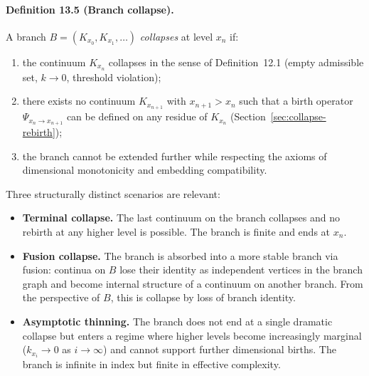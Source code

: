 \paragraph{Definition 13.5 (Branch collapse).}
A branch \(B = (K_{x_0}, K_{x_1}, \dots)\) \emph{collapses} at level
\(x_n\) if:
\begin{enumerate}
  \item the continuum \(K_{x_n}\) collapses in the sense of
        Definition~12.1 (empty admissible set, \(k\to 0\), threshold
        violation);
  \item there exists no continuum \(K_{x_{n+1}}\) with \(x_{n+1}>x_n\)
        such that a birth operator \(\Psi_{x_n\to x_{n+1}}\) can be
        defined on any residue of \(K_{x_n}\) (Section~\ref{sec:collapse-rebirth});
  \item the branch cannot be extended further while respecting the axioms
        of dimensional monotonicity and embedding compatibility.
\end{enumerate}

Three structurally distinct scenarios are relevant:

\begin{itemize}
  \item \textbf{Terminal collapse.}\quad
        The last continuum on the branch collapses and no rebirth at any
        higher level is possible. The branch is finite and ends at \(x_n\).
  \item \textbf{Fusion collapse.}\quad
        The branch is absorbed into a more stable branch via fusion:
        continua on \(B\) lose their identity as independent vertices in
        the branch graph and become internal structure of a continuum on
        another branch. From the perspective of \(B\), this is collapse by
        loss of branch identity.
  \item \textbf{Asymptotic thinning.}\quad
        The branch does not end at a single dramatic collapse but enters a
        regime where higher levels become increasingly marginal
        (\(k_{x_i}\to 0\) as \(i\to\infty\)) and cannot support further
        dimensional births. The branch is infinite in index but finite in
        effective complexity.
\end{itemize}

